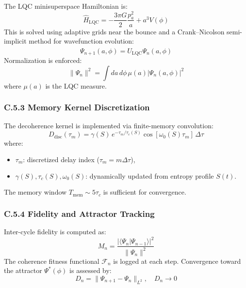 The LQC minisuperspace Hamiltonian is:
\begin{equation}
\hat{H}_{\text{LQC}} = -\frac{3\pi G}{2} \frac{p_a^2}{a} + a^3 V(\phi)
\end{equation}
This is solved using adaptive grids near the bounce and a Crank–Nicolson semi-implicit method for wavefunction evolution:
\begin{equation}
\Psi_{n+1}(a,\phi) = \hat{U}_{\text{LQC}} \Psi_n(a,\phi)
\end{equation}
Normalization is enforced:
\begin{equation}
\|\Psi_n\|^2 = \int da \, d\phi \, \mu(a) |\Psi_n(a,\phi)|^2
\end{equation}
where \( \mu(a) \) is the LQC measure.

\subsubsection*{C.5.3 Memory Kernel Discretization}

The decoherence kernel is implemented via finite-memory convolution:
\begin{equation}
D_{\text{disc}}(\tau_m) = \gamma(S) \, e^{-\tau_m/\tau_c(S)} \cos[\omega_0(S) \tau_m] \, \Delta \tau
\end{equation}
where:
\begin{itemize}
  \item \( \tau_m \): discretized delay index (\( \tau_m = m \Delta \tau \)),
  \item \( \gamma(S), \tau_c(S), \omega_0(S) \): dynamically updated from entropy profile \( S(t) \).
\end{itemize}
The memory window \( T_{\text{mem}} \sim 5\tau_c \) is sufficient for convergence.

\subsubsection*{C.5.4 Fidelity and Attractor Tracking}

Inter-cycle fidelity is computed as:
\begin{equation}
M_n = \frac{|\langle \Psi_n | \Psi_{n-1} \rangle|^2}{\|\Psi_n\|^2}
\end{equation}
The coherence fitness functional \( \mathcal{F}_n \) is logged at each step. Convergence toward the attractor \( \Psi^*(\phi) \) is assessed by:
\begin{equation}
D_n = \| \Psi_{n+1} - \Psi_n \|_{L^2}, \quad D_n \to 0
\end{equation}

